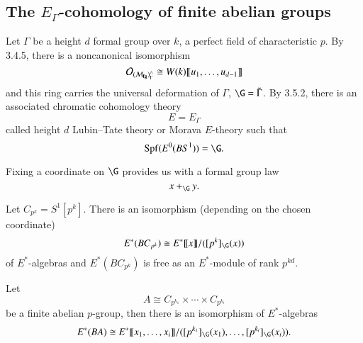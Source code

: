 

\subsection*{The $E_{\Gamma}$-cohomology of finite abelian groups}



Let $\Gamma$ be a height $d$ formal group over $k$, a perfect field of characteristic $p$. By 3.4.5, there is a noncanonical isomorphism 
\[
\mathcal{O}_{(\mathcal{M}_{\mathbf{fg}})^\wedge_\Gamma} \cong W(k)\llbracket{u_1, \ldots, u_{d-1}}\rrbracket
\] 
and this ring carries the universal deformation of $\Gamma$, $\G = \tilde{\Gamma}$. By 3.5.2, there is an associated chromatic cohomology theory
\[
E = E_{\Gamma}
\]
called height $d$ Lubin--Tate theory or Morava $E$-theory such that
\[
\Spf(E^0(BS^1)) = \G.
\]

Fixing a coordinate on $\G$ provides us with a formal group law
\[
x +_{\G} y.
\]

\begin{proposition} \label{app:cyclic}
Let $C_{p^k} = S^1[p^k]$. There is an isomorphism (depending on the chosen coordinate) 
\[
E^*(BC_{p^k}) \cong E^*\ps{x}/([p^k]_{\G}(x))
\]
of $E^*$-algebras and $E^*(BC_{p^k})$ is free as an $E^*$-module of rank $p^{kd}$.
\end{proposition}

\begin{proposition} \label{app:ab}
Let 
\[
A \cong C_{p^{k_1}} \times \cdots \times C_{p^{k_i}}
\]
be a finite abelian $p$-group, then there is an isomorphism of $E^*$-algebras
\[
E^*(BA) \cong E^*\ps{x_1, \ldots, x_{i}}/([p^{k_1}]_{\G}(x_1), \ldots, [p^{k_i}]_{\G}(x_i)).
\]
\end{proposition}

